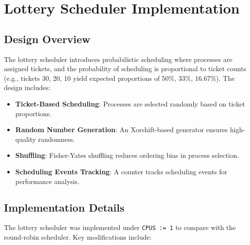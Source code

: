 \documentclass[12pt]{article}
\begin{document}
\section{Lottery Scheduler Implementation}
\label{sec:lottery-scheduler}

\subsection{Design Overview}
\label{subsec:lottery-design}

The lottery scheduler introduces probabilistic scheduling where processes are assigned tickets, and the probability of scheduling is proportional to ticket counts (e.g., tickets 30, 20, 10 yield expected proportions of 50\%, 33\%, 16.67\%). The design includes:

\begin{itemize}
  \item \textbf{Ticket-Based Scheduling}: Processes are selected randomly based on ticket proportions.
  \item \textbf{Random Number Generation}: An Xorshift-based generator ensures high-quality randomness.
  \item \textbf{Shuffling}: Fisher-Yates shuffling reduces ordering bias in process selection.
  \item \textbf{Scheduling Events Tracking}: A counter tracks scheduling events for performance analysis.
\end{itemize}

\subsection{Implementation Details}
\label{subsec:lottery-implementation}

The lottery scheduler was implemented under \texttt{CPUS := 1} to compare with the round-robin scheduler. Key modifications include:
\end{document}
